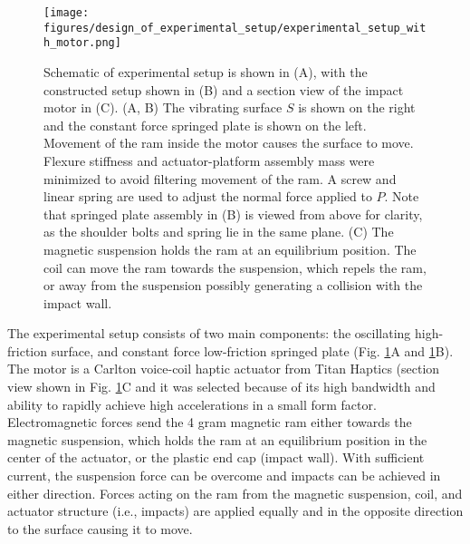 \begin{figure}[tb]
    \centering
    \texttt{[image: figures/design\_of\_experimental\_setup/experimental\_setup\_with\_motor.png]}
    \caption{Schematic of experimental setup is shown in (A), with the constructed setup shown in (B) and a section view of the impact motor in (C). 
    (A, B) The vibrating surface $S$ is shown on the right and the constant force springed plate is shown on the left. 
    Movement of the ram inside the motor causes the surface to move. 
    Flexure stiffness and actuator-platform assembly mass were minimized to avoid filtering movement of the ram. 
    A screw and linear spring are used to adjust the normal force applied to $P$.
    Note that springed plate assembly in (B) is viewed from above for clarity, as the shoulder bolts and spring lie in the same plane.
    (C) The magnetic suspension holds the ram at an equilibrium position. 
    The coil can move the ram towards the suspension, which repels the ram, or away from the suspension possibly generating a collision with the impact wall.}
    \label{figure: experimental_setup}
    \vspace{\shift}
\end{figure}

The experimental setup consists of two main components: the oscillating high-friction surface, and constant force low-friction springed plate (Fig. \ref{figure: experimental_setup}A 
and \ref{figure: experimental_setup}B). 
%
The motor is a Carlton voice-coil haptic actuator from Titan Haptics (section view shown in Fig. \ref{figure: experimental_setup}C and it was selected because of its high bandwidth and ability to rapidly achieve high accelerations in a small form factor.
%
Electromagnetic forces send the 4 gram magnetic ram either towards the magnetic suspension, which holds the ram at an equilibrium position in the center of the actuator, or the plastic end cap (impact wall).
%
With sufficient current, the suspension force can be overcome and impacts can be achieved in either direction.
%
Forces acting on the ram from the magnetic suspension, coil, and actuator structure (i.e., impacts) are applied equally and in the opposite direction to the surface causing it to move.


